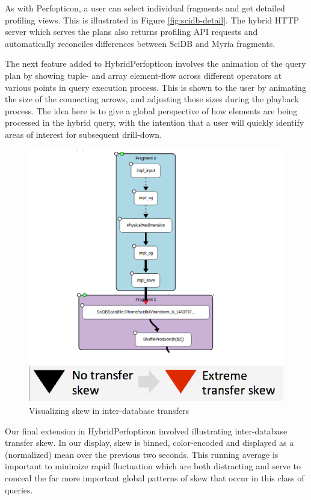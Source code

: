 \documentclass{chi2009}
\begin{document}
As with Perfopticon, a user can select individual fragments and get detailed profiling views.  This is illustrated in Figure \ref{fig:scidb-detail}. The hybrid HTTP server which serves the plans also returns profiling API requests and automatically reconciles differences between SciDB and Myria fragments. 

The next feature added to HybridPerfopticon involves the animation of the query plan by showing tuple- and array element-flow across different operators at various points in query execution process. This is shown to the user by animating the size of the connecting arrows, and adjusting those sizes during the playback process. The idea here is to give a global perspective of how elements are being processed in the hybrid query, with the intention that a user will quickly identify areas of interest for subsequent drill-down.

\begin{figure}[h]
\begin{center}
\includegraphics[scale=0.5]{skew.png}
\end{center}
\caption{Visualizing skew in inter-database transfers}
\label{fig:skew}
\end{figure}

Our final extension in HybridPerfopticon involved illustrating inter-database transfer skew.  In our display, skew is binned, color-encoded and displayed as a (normalized) mean over the previous two seconds.  This running average is important to minimize rapid fluctuation which are both distracting and serve to conceal the far more important global patterns of skew that occur in this class of queries. 
\end{document}
